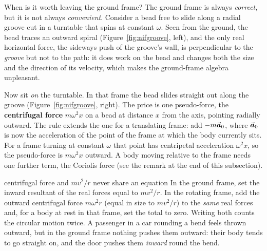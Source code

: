 \begin{motivbox}{When is it worth leaving the ground frame?}
The ground frame is always \emph{correct}, but it is not always \emph{convenient}. Consider a bead free
to slide along a radial groove cut in a turntable that spins at constant $\omega$. Seen from the
ground, the bead traces an outward spiral (Figure~\ref{fig:nifgroove}, left), and the only real horizontal force, the sideways push of
the groove's wall, is perpendicular to the \emph{groove} but not to the path: it does work on the bead
and changes both the size and the direction of its velocity, which makes the ground-frame algebra
unpleasant.

Now sit \emph{on} the turntable. In that frame the bead slides straight out along the groove
(Figure~\ref{fig:nifgroove}, right).
The price is one pseudo-force, the \textbf{centrifugal force} $m\omega^{2}x$ on a bead at distance $x$
from the axis, pointing radially outward. The rule extends the one for a translating frame: add $-m\vec{\bm{a}}_0$,
where $\vec{\bm{a}}_0$ is now the acceleration of the point of the frame at which the body currently sits. For a frame
turning at constant $\omega$ that point has centripetal acceleration $\omega^{2}x$, so the pseudo-force
is $m\omega^{2}x$ outward. A body moving relative to the frame needs one further term, the Coriolis
force (see the remark at the end of this subsection).
\end{motivbox}

\begin{trapbox}{centrifugal force and $mv^2/r$ never share an equation}
In the ground frame, set the inward resultant of the real forces equal to $mv^2/r$. In the rotating
frame, add the outward centrifugal force $m\omega^2r$ (equal in size to $mv^2/r$) to the \emph{same} real
forces and, for a body at rest in that frame, set the total to zero. Writing both counts the circular motion twice. A passenger in a car
rounding a bend feels thrown outward, but in the ground frame nothing pushes them outward: their body
tends to go straight on, and the door pushes them \emph{inward} round the bend.
\end{trapbox}

\begin{figure}[htbp]
\centering
{}
\end{figure}

